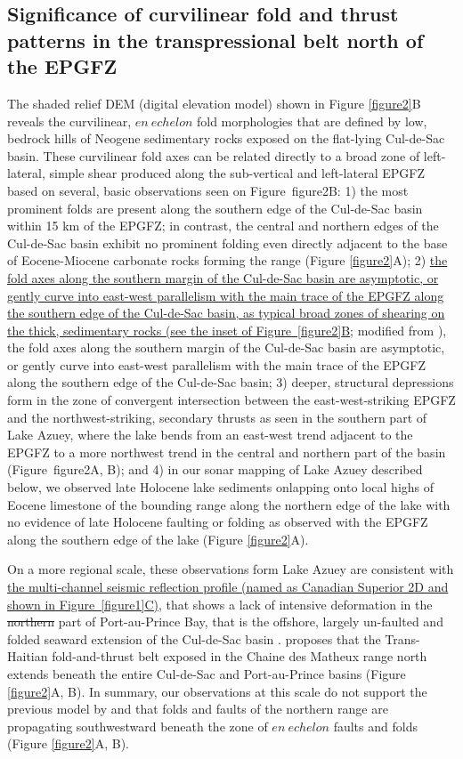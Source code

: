 \documentclass[linenumbers,draft]{agujournal}
\begin{document}
\subsection{Significance of curvilinear fold and thrust patterns in the transpressional belt north of the EPGFZ}
The shaded relief DEM (digital elevation model) shown in Figure \ref{figure2}B reveals the curvilinear, $en~echelon$ fold morphologies that are defined by low, bedrock hills of Neogene sedimentary rocks exposed on the flat-lying Cul-de-Sac basin. These curvilinear fold axes can be related directly to a broad zone of left-lateral, simple shear produced along the sub-vertical and left-lateral EPGFZ based on several, basic observations seen on Figure~{figure2}B: 1) the most prominent folds are present along the southern edge of the Cul-de-Sac basin within 15 km of the EPGFZ; in contrast, the central and northern edges of the Cul-de-Sac basin exhibit no prominent folding even directly adjacent to the base of Eocene-Miocene carbonate rocks forming the range \citep{pubellier2000plate} (Figure \ref{figure2}A); 2) \ul{the fold axes along the southern margin of the Cul-de-Sac basin are asymptotic, or gently curve into east-west parallelism with the main trace of the EPGFZ along the southern edge of the Cul-de-Sac basin, as typical broad zones of shearing on the thick, sedimentary rocks (see the inset of Figure~{\ref{figure2}}B}; modified from \citet{odonne1983analogue}), the fold axes along the southern margin of the Cul-de-Sac basin are asymptotic, or gently curve into east-west parallelism with the main trace of the EPGFZ along the southern edge of the Cul-de-Sac basin; 3) deeper, structural depressions form in the zone of convergent intersection between the east-west-striking EPGFZ and the northwest-striking, secondary thrusts as seen in the southern part of Lake Azuey, where the lake bends from an east-west trend adjacent to the EPGFZ to a more northwest trend in the central and northern part of the basin (Figure~{figure2}A, B); and 4) in our sonar mapping of Lake Azuey described below, we observed late Holocene lake sediments onlapping onto local highs of Eocene limestone of the bounding range along the northern edge of the lake with no evidence of late Holocene faulting or folding as observed with the EPGFZ along the southern edge of the lake (Figure \ref{figure2}A). 

On a more regional scale, these observations form Lake Azuey are consistent with \ul{the multi-channel seismic reflection profile (named as Canadian Superior 2D and shown in Figure~{\ref{figure1}}C)}, that shows a lack of intensive deformation in the \st{northern} part of Port-au-Prince Bay, that is the offshore, largely un-faulted and folded seaward extension of the Cul-de-Sac basin \citep{mchugh2011offshore}. \citet{pubellier2000plate} proposes that the Trans-Haitian fold-and-thrust belt exposed in the Chaine des Matheux range north extends beneath the entire Cul-de-Sac and Port-au-Prince basins (Figure \ref{figure2}A, B). In summary, our observations at this scale do not support the previous model by \citet{pubellier2000plate} and \citet{calais2010transpressional} that folds and faults of the northern range are propagating southwestward beneath the zone of $en~echelon$ faults and folds (Figure \ref{figure2}A, B).
\end{document}

